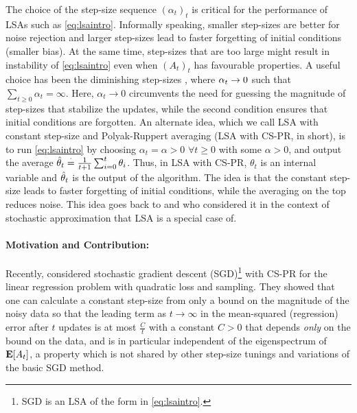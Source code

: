 The choice of the step-size sequence $(\alpha_t)_t$ is critical for the performance of LSAs such as \eqref{eq:lsaintro}.
Informally speaking, smaller step-sizes are better for noise rejection and larger step-sizes lead to faster forgetting of initial conditions (smaller bias). At the same time, step-sizes that are too large might result in instability of \eqref{eq:lsaintro} even when $(A_t)_t$ has favourable properties. 
A useful choice has been the diminishing step-sizes \cite{gtd2,gtdmp,konda-tsitsiklis}, where $\alpha_t\rightarrow 0$ such that $\sum_{t\geq 0} \alpha_t=\infty$. Here, $\alpha_t\to0$ circumvents the need for guessing the magnitude of step-sizes that stabilize the updates, while the second condition ensures that initial conditions are forgotten. 
An alternate idea, which we call LSA with constant step-size and Polyak-Ruppert averaging (LSA with CS-PR, in short), is to run \eqref{eq:lsaintro} by choosing $\alpha_t=\alpha>0$ $\forall t\geq 0$ with some $\alpha>0$, and output the average $\hat{\theta}_t\stackrel{\cdot}{=}\frac{1}{t+1}\sum_{i=0}^t \theta_i$. Thus, in LSA with CS-PR, $\theta_t$ is an internal variable and $\hat{\theta}_t$ is the output of the algorithm. The idea is that the constant step-size leads to faster forgetting of initial conditions, while the averaging on the top
reduces noise.
This idea goes back to  \citet{ruppert} and \citet{polyak-judisky} who considered it in the context of stochastic approximation that LSA is a special case of. 
\paragraph{Motivation and Contribution:} Recently, \citet{bach} considered stochastic gradient descent (SGD)\footnote{SGD is an LSA of the form in \eqref{eq:lsaintro}.} with CS-PR for the linear regression problem with quadratic loss and \iid sampling. They showed that one can calculate a constant step-size from only a bound on the magnitude of the noisy data so that the leading term as $t\to\infty$
 in the mean-squared (regression) error after $t$ updates is at most $\frac{C}{t}$ with a constant $C>0$ that depends \emph{only} on the bound on the data, and is in particular independent of the eigenspectrum of $\mathbf{E}[A_t]$, a property which is not shared by other step-size tunings and variations of the basic SGD method.

